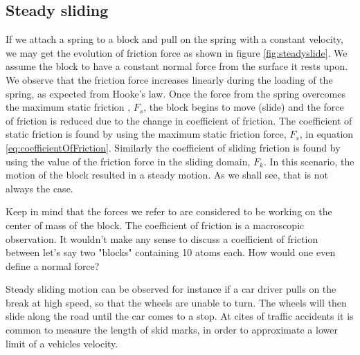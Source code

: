 \documentclass[twoside,english]{uiofysmaster}
\begin{document}
\subsection{Steady sliding}
If we attach a spring to a block and pull on the spring with a constant velocity, we may get the evolution of friction force as shown in figure \ref{fig:steadyslide}.
We assume the block to have a constant normal force from the surface it rests upon. 
We observe that the friction force increases linearly during the loading of the spring, as expected from Hooke's law. 
Once the force from the spring overcomes the maximum static friction , $F_s$, the block begins to move (slide) and the force of friction is reduced due to the change in coefficient of friction. 
The coefficient of static friction is found by using the maximum static friction force, $F_s$, in equation \eqref{eq:coefficientOfFriction}. 
Similarly the coefficient of sliding friction is found by using the value of the friction force in the sliding domain, $F_k$.
In this scenario, the motion of the block resulted in a steady motion. 
As we shall see, that is not always the case.

Keep in mind that the forces we refer to are considered to be working on the center of mass of the block. 
The coefficient of friction is a macroscopic observation.
It wouldn't make any sense to discuss a coefficient of friction between let's say two "blocks" containing 10 atoms each.
How would one even define a normal force? 

Steady sliding motion can be observed for instance if a car driver pulls on the break at high speed, so that the wheels are unable to turn.
The wheels will then slide along the road until the car comes to a stop. 
At cites of traffic accidents it is common to measure the length of skid marks, in order to approximate a lower limit of a vehicles velocity. 
\raggedbottom
\end{document}
